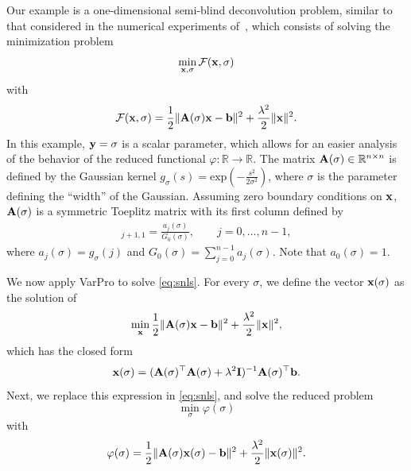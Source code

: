 \documentclass[onefignum,onetabnum]{siamart171218}
\newcommand{\bA}{{\bf A}}
\newcommand{\bI}{{\bf I}}
\newcommand{\bb}{{\bf b}}
\newcommand{\bx}{{\bf x}}
\newcommand{\by}{{\bf y}}
\newcommand{\calF}{\mathcal{F}}
\begin{document}
Our example is a one-dimensional semi-blind deconvolution problem, similar to that considered in the numerical experiments of~\cite{Espanol_2023}, which consists of solving the minimization problem
\begin{equation}\label{eq:snls}
\min_{\bx, \sigma}  \calF(\bx,\sigma) 
\end{equation}
with $$\calF(\bx,\sigma) = \frac{1}{2}\| \bA(\sigma)\bx - \bb \|^2 + \frac{\lambda^2}{2} \|\bx\|^2.$$
In this example, $\by = \sigma$ is a scalar parameter, which allows for an easier analysis of the behavior of the reduced functional $\varphi\colon \mathbb{R} \to \mathbb{R}$. The matrix $\bA(\sigma)\in \mathbb{R}^{n\times n}$ is defined by the Gaussian kernel
$g_\sigma(s) = \mbox{exp}\left(-\frac{s^2}{2\sigma^2}\right)$, where $\sigma$ is the parameter defining the ``width'' of the Gaussian. Assuming zero boundary conditions on $\bx$, $\bA(\sigma)$ is a symmetric Toeplitz matrix with its first column defined by
\begin{align}
   [\bA(\sigma)]_{j+1,1}= \frac{a_j(\sigma)}{G_0(\sigma)}  , \qquad j=0, \dots, n-1,\nonumber
\end{align}
where $a_j(\sigma)=g_\sigma(j)$ and  $G_0(\sigma) = \sum_{j=0}^{n-1} a_j(\sigma)$. Note that $a_0(\sigma)=1$.

We now apply VarPro to solve \eqref{eq:snls}. For every $\sigma$, we define the vector $\bx(\sigma)$ as the solution of
\[ \min_{\bx} \frac{1}{2}\|\bA(\sigma) \bx - \bb \|^2 + \frac{\lambda^2}{2}\| \bx\|^2,\]
which has the closed form
\[\bx(\sigma) = (\bA(\sigma)^\top \bA(\sigma) + \lambda^2 \bI)^{-1} \bA(\sigma)^\top \bb.\]
Next, we  replace this expression  in \eqref{eq:snls}, and solve the reduced problem
\begin{equation*}
\min_\sigma  \varphi(\sigma) 
\end{equation*}
with 
\begin{equation}\label{eq: Tik-problem}
\varphi(\sigma) = \frac{1}{2}\|\bA(\sigma) \bx(\sigma) - \bb\|^2 + \frac{\lambda^2}{2} \| \bx(\sigma)\|^2.
\end{equation}
\end{document}
